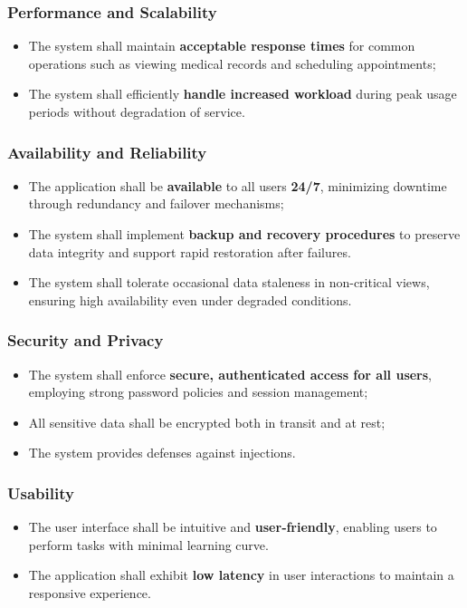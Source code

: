 \subsubsection{Performance and Scalability}
\begin{itemize}
	\item The system shall maintain \textbf{acceptable response times} for common operations such as viewing medical records and scheduling appointments; 
	\item The system shall efficiently \textbf{handle increased workload} during peak usage periods without degradation of service.
\end{itemize}

\subsubsection{Availability and Reliability}
\begin{itemize}
	\item The application shall be \textbf{available} to all users \textbf{24/7}, minimizing downtime through redundancy and failover mechanisms;
	\item The system shall implement \textbf{backup and recovery procedures} to preserve data integrity and support rapid restoration after failures.
	\item The system shall tolerate occasional data staleness in non-critical views, ensuring high availability even under degraded conditions.
\end{itemize}

\subsubsection{Security and Privacy}
\begin{itemize}
	\item The system shall enforce \textbf{secure, authenticated access for all users}, employing strong password policies and session management;
	\item All sensitive data shall be encrypted both in transit and at rest;
	\item The system provides defenses against injections. 
\end{itemize}

\subsubsection{Usability}
\begin{itemize}
	\item The user interface shall be intuitive and \textbf{user‑friendly}, enabling users to perform tasks with minimal learning curve.
	\item The application shall exhibit \textbf{low latency} in user interactions to maintain a responsive experience.
\end{itemize}

